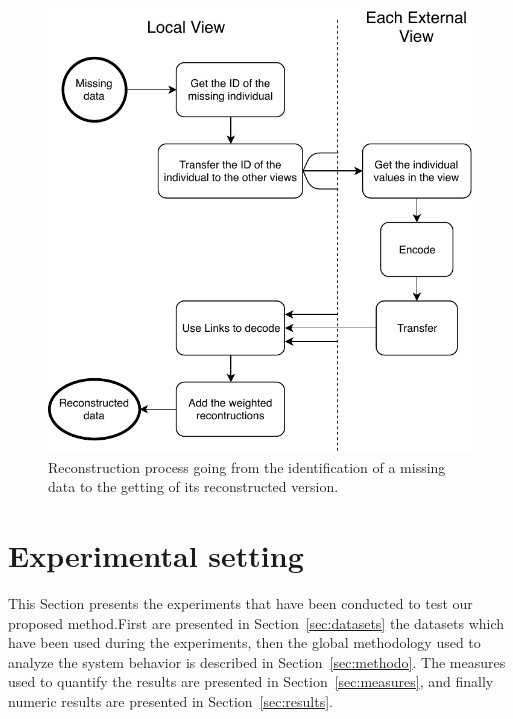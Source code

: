 	\begin{figure}[h]
		\centering
		\includegraphics[scale=0.8]{img/process.pdf}
        \caption{Reconstruction process going from the identification of a
        missing data to the getting of its reconstructed version.}
\label{fig:process}
	\end{figure}	
	
	\section{Experimental setting}
\label{sec:exp}
This Section presents the experiments that have been conducted to test our proposed method.\@ First are presented in Section~\ref{sec:datasets} the datasets which have been used during the experiments, then the global methodology used to analyze the system behavior is described in Section~\ref{sec:methodo}. The measures used to quantify the results are presented in Section~\ref{sec:measures}, and finally numeric results are presented in Section~\ref{sec:results}.

